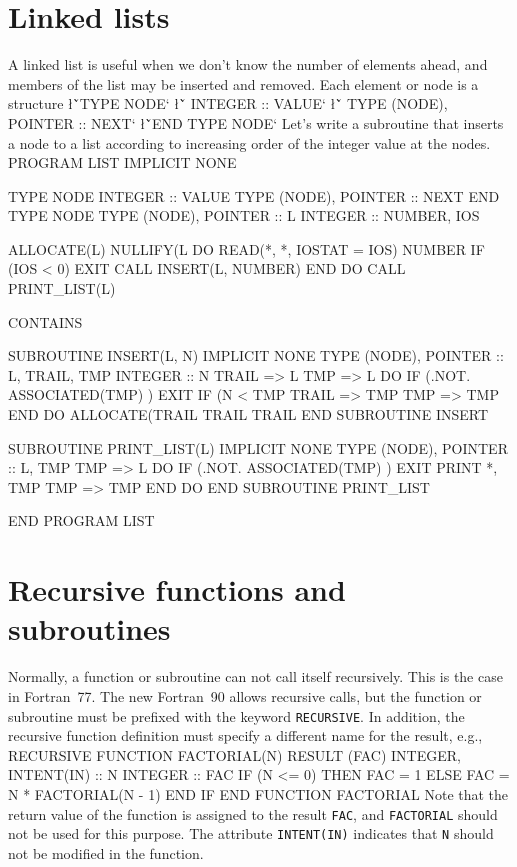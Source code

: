 {{\section{Linked lists}
A linked list is useful when we don't know the number of elements
ahead, and members of the list may be inserted and removed. 
Each element or node is a structure
\sms
\l{\v`TYPE NODE`\m{}}
\l{\v`   INTEGER :: VALUE`}
\l{\v`   TYPE (NODE), POINTER :: NEXT`}
\l{\v`END TYPE NODE`\m{}}
\sms
Let's write a subroutine that inserts a node to a list according to 
increasing order of the integer value at the nodes. 
\ttbg
PROGRAM LIST
   IMPLICIT NONE

   TYPE NODE
      INTEGER :: VALUE
      TYPE (NODE), POINTER :: NEXT 
   END TYPE NODE
   TYPE (NODE), POINTER :: L
   INTEGER :: NUMBER, IOS 
 
   ALLOCATE(L)
   NULLIFY(L%
   DO
      READ(*, *, IOSTAT = IOS) NUMBER
      IF (IOS < 0) EXIT
      CALL INSERT(L, NUMBER)
   END DO
   CALL PRINT_LIST(L)

CONTAINS

SUBROUTINE INSERT(L, N)
   IMPLICIT NONE
   TYPE (NODE), POINTER :: L, TRAIL, TMP
   INTEGER :: N
   TRAIL => L
   TMP => L%
   DO
      IF (.NOT. ASSOCIATED(TMP) ) EXIT
      IF (N < TMP%
      TRAIL => TMP
      TMP => TMP%
   END DO
   ALLOCATE(TRAIL%
   TRAIL%
   TRAIL%
END SUBROUTINE INSERT

SUBROUTINE PRINT_LIST(L)
   IMPLICIT NONE
   TYPE (NODE), POINTER :: L, TMP
   TMP => L%
   DO
      IF (.NOT. ASSOCIATED(TMP) ) EXIT
      PRINT *, TMP%
      TMP => TMP%
   END DO
END SUBROUTINE PRINT_LIST

END PROGRAM LIST
\tted



\section{Recursive functions and subroutines}
Normally, a function or subroutine can not call itself recursively.  
This is the case in Fortran~77. The new Fortran~90 allows recursive
calls, but the function or subroutine must be prefixed with the keyword
{\tt RECURSIVE}.  In addition, the recursive function definition must
specify a different name for the result, e.g.,
\ttbg
RECURSIVE FUNCTION FACTORIAL(N) RESULT (FAC)
   INTEGER, INTENT(IN) :: N
   INTEGER :: FAC
   IF (N <= 0) THEN
      FAC = 1
   ELSE
      FAC = N * FACTORIAL(N - 1)
   END IF
END FUNCTION FACTORIAL
\tted
Note that the return value of the function is assigned to the result
{\tt FAC}, and {\tt FACTORIAL} should not be used for this purpose.
The attribute {\tt INTENT(IN)} indicates that {\tt N} should not be
modified in the function.  

}}
